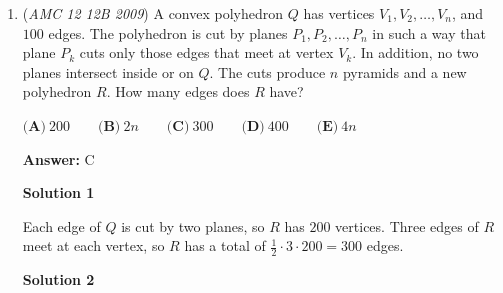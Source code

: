 \begin{enumerate}
 Now we can use the formula $(x^2 - y^2) = (x-y)(x+y)$ to obtain the same factorization as in the previous solution, without all the work.

 



\textbf{Solution 4}

After arriving at the factorization $f(x) = (x^2 - 20x + 20)(x^2 + 20x + 20)$, a more mathematical approach would be to realize that the second factor is always positive when $x$ is a positive integer. Therefore, in order for $f(x)$ to be prime, the first factor has to be $1$.

 We can set it equal to 1 and solve for $x$: 

 $x^2-20x+20=1$
$x^2-20x+19=0$
$(x-1)(x-19)=0$
$x=1, x=19$

 Substituting these values into the second factor and adding would give the answer.

 \textbf{A way to find the desired factorization} Essentially since we want to find when the function is prime, we shall attempt to factor the polynomial. Notice we have $(n^2+20)^2-400n^2=n^4-360n^2+400$, and difference of squares gives the desired factorization, and we can continue as in any other solution. Furthermore, the motivation from doing $(n^2+20)^2$ is since it matches the leading term in f(x) and the constant term.

 


	\item (\textit{AMC 12 12B 2009}) A convex polyhedron $Q$ has vertices $V_1,V_2,\ldots,V_n$, and $100$ edges. The polyhedron is cut by planes $P_1,P_2,\ldots,P_n$ in such a way that plane $P_k$ cuts only those edges that meet at vertex $V_k$. In addition, no two planes intersect inside or on $Q$. The cuts produce $n$ pyramids and a new polyhedron $R$. How many edges does $R$ have?


 $\textbf{(A)}\ 200\qquad \textbf{(B)}\ 2n\qquad \textbf{(C)}\ 300\qquad \textbf{(D)}\ 400\qquad \textbf{(E)}\ 4n$

 \textbf{Answer: }C



\textbf{Solution 1}

Each edge of $Q$ is cut by two planes, so $R$ has $200$ vertices. Three edges of $R$ meet at each vertex, so $R$ has a total of $\frac 12 \cdot 3 \cdot 200 = \boxed {300}$ edges.

 



\textbf{Solution 2}


\end{enumerate}
